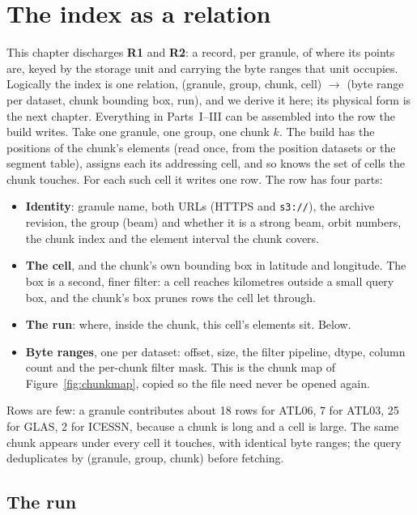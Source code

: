 \documentclass[10pt,a4paper]{article}
\newcommand{\code}[1]{\texttt{#1}}
\newcommand{\req}[1]{\textbf{R#1}}
\begin{document}
\section{The index as a relation}
\label{ch:row}

This chapter discharges \req{1} and \req{2}: a record, per granule, of where its points are, keyed by the storage
unit and carrying the byte ranges that unit occupies. Logically the index is one relation, (granule, group, chunk,
cell) $\to$ (byte range per dataset, chunk bounding box, run), and we derive it here; its physical form is the next
chapter. Everything in Parts~I--III can be assembled into the row the build writes. Take one granule, one group, one chunk $k$.
The build has the positions of the chunk's elements (read once, from the position datasets or the segment table),
assigns each its addressing cell, and so knows the set of cells the chunk touches. For each such cell it writes one
row. The row has four parts:

\begin{itemize}
\item \textbf{Identity}: granule name, both URLs (HTTPS and \code{s3://}), the archive revision, the group
  (beam) and whether it is a strong beam, orbit numbers, the chunk index and the element interval the chunk covers.
\item \textbf{The cell}, and the chunk's own bounding box in latitude and longitude. The box is a second, finer
  filter: a cell reaches kilometres outside a small query box, and the chunk's box prunes rows the cell let through.
\item \textbf{The run}: where, inside the chunk, this cell's elements sit. Below.
\item \textbf{Byte ranges}, one per dataset: offset, size, the filter pipeline, dtype, column count and the per-chunk
  filter mask. This is the chunk map of Figure~\ref{fig:chunkmap}, copied so the file need never be opened again.
\end{itemize}

Rows are few: a granule contributes about 18 rows for ATL06, 7 for ATL03, 25 for GLAS, 2 for ICESSN, because a
chunk is long and a cell is large. The same chunk appears under every cell it touches, with identical byte ranges;
the query deduplicates by (granule, group, chunk) before fetching.

\subsection{The run}
\end{document}
